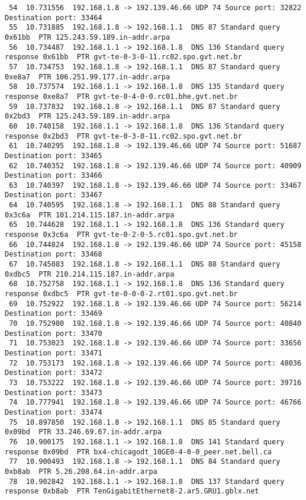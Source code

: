 \documentclass[a4paper]{report} %
\begin{document}
\begin{lstlisting}
 54  10.731556  192.168.1.8 -> 192.139.46.66 UDP 74 Source port: 32822  Destination port: 33464
 55  10.731885  192.168.1.8 -> 192.168.1.1  DNS 87 Standard query 0x61bb  PTR 125.243.59.189.in-addr.arpa
 56  10.734487  192.168.1.1 -> 192.168.1.8  DNS 136 Standard query response 0x61bb  PTR gvt-te-0-3-0-11.rc02.spo.gvt.net.br
 57  10.734753  192.168.1.8 -> 192.168.1.1  DNS 87 Standard query 0xe8a7  PTR 106.251.99.177.in-addr.arpa
 58  10.737574  192.168.1.1 -> 192.168.1.8  DNS 135 Standard query response 0xe8a7  PTR gvt-te-0-4-0-0.rc01.bhe.gvt.net.br
 59  10.737832  192.168.1.8 -> 192.168.1.1  DNS 87 Standard query 0x2bd3  PTR 125.243.59.189.in-addr.arpa
 60  10.740158  192.168.1.1 -> 192.168.1.8  DNS 136 Standard query response 0x2bd3  PTR gvt-te-0-3-0-11.rc02.spo.gvt.net.br
 61  10.740295  192.168.1.8 -> 192.139.46.66 UDP 74 Source port: 51687  Destination port: 33465
 62  10.740352  192.168.1.8 -> 192.139.46.66 UDP 74 Source port: 40909  Destination port: 33466
 63  10.740397  192.168.1.8 -> 192.139.46.66 UDP 74 Source port: 33467  Destination port: 33467
 64  10.740595  192.168.1.8 -> 192.168.1.1  DNS 88 Standard query 0x3c6a  PTR 101.214.115.187.in-addr.arpa
 65  10.744628  192.168.1.1 -> 192.168.1.8  DNS 136 Standard query response 0x3c6a  PTR gvt-te-0-2-0-5.rc01.spo.gvt.net.br
 66  10.744824  192.168.1.8 -> 192.139.46.66 UDP 74 Source port: 45158  Destination port: 33468
 67  10.745083  192.168.1.8 -> 192.168.1.1  DNS 88 Standard query 0xdbc5  PTR 210.214.115.187.in-addr.arpa
 68  10.752758  192.168.1.1 -> 192.168.1.8  DNS 136 Standard query response 0xdbc5  PTR gvt-te-0-0-0-2.rt01.spo.gvt.net.br
 69  10.752922  192.168.1.8 -> 192.139.46.66 UDP 74 Source port: 56214  Destination port: 33469
 70  10.752980  192.168.1.8 -> 192.139.46.66 UDP 74 Source port: 40840  Destination port: 33470
 71  10.753023  192.168.1.8 -> 192.139.46.66 UDP 74 Source port: 33656  Destination port: 33471
 72  10.753173  192.168.1.8 -> 192.139.46.66 UDP 74 Source port: 48036  Destination port: 33472
 73  10.753222  192.168.1.8 -> 192.139.46.66 UDP 74 Source port: 39716  Destination port: 33473
 74  10.777941  192.168.1.8 -> 192.139.46.66 UDP 74 Source port: 46766  Destination port: 33474
 75  10.897850  192.168.1.8 -> 192.168.1.1  DNS 85 Standard query 0x09bd  PTR 33.246.69.67.in-addr.arpa
 76  10.900175  192.168.1.1 -> 192.168.1.8  DNS 141 Standard query response 0x09bd  PTR bx4-chicagodt_10GE0-4-0-0_peer.net.bell.ca
 77  10.900493  192.168.1.8 -> 192.168.1.1  DNS 84 Standard query 0xb8ab  PTR 5.26.208.64.in-addr.arpa
 78  10.902842  192.168.1.1 -> 192.168.1.8  DNS 137 Standard query response 0xb8ab  PTR TenGigabitEthernet8-2.ar5.GRU1.gblx.net

\end{lstlisting}
\end{document}
